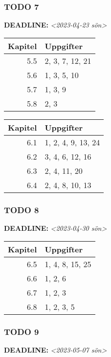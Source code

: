 \documentclass[11pt]{article}
\begin{document}
\subsubsection{{\bfseries\sffamily TODO} 7}
\label{sec:org854bdda}
\noindent\textbf{DEADLINE:} \textit{<2023-04-23 sön>}\\[0pt]

\begin{center}
\begin{tabular}{rl}
Kapitel & Uppgifter\\[0pt]
\hline
5.5 & 2, 3, 7, 12, 21\\[0pt]
5.6 & 1, 3, 5, 10\\[0pt]
5.7 & 1, 3, 9\\[0pt]
5.8 & 2, 3\\[0pt]
\end{tabular}
\end{center}

\begin{center}
\begin{tabular}{rl}
Kapitel & Uppgifter\\[0pt]
\hline
6.1 & 1, 2, 4, 9, 13, 24\\[0pt]
6.2 & 3, 4, 6, 12, 16\\[0pt]
6.3 & 2, 4, 11, 20\\[0pt]
6.4 & 2, 4, 8, 10, 13\\[0pt]
\end{tabular}
\end{center}

\subsubsection{{\bfseries\sffamily TODO} 8}
\label{sec:org1a96f70}
\noindent\textbf{DEADLINE:} \textit{<2023-04-30 sön>}\\[0pt]

\begin{center}
\begin{tabular}{rl}
Kapitel & Uppgifter\\[0pt]
\hline
6.5 & 1, 4, 8, 15, 25\\[0pt]
6.6 & 1, 2, 6\\[0pt]
6.7 & 1, 2, 3\\[0pt]
6.8 & 1, 2, 3, 5\\[0pt]
\end{tabular}
\end{center}


\subsubsection{{\bfseries\sffamily TODO} 9}
\label{sec:org403ab37}
\noindent\textbf{DEADLINE:} \textit{<2023-05-07 sön>}\\[0pt]
\end{document}
